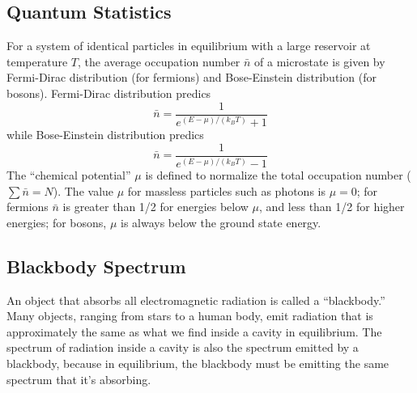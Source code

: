 \documentclass[../../../main.tex]{subfiles}
\begin{document}
\subsection{Quantum Statistics}
For a system of identical particles in equilibrium with a large reservoir at temperature $T$, the average occupation number $\bar{n}$ of a microstate is given by Fermi-Dirac distribution (for fermions) and Bose-Einstein distribution (for bosons). Fermi-Dirac distribution predics
\begin{equation*}
    \bar{n}=\frac{1}{e^{(E-\mu)/(k_BT)}+1}
\end{equation*}
while Bose-Einstein distribution predics
\begin{equation*}
    \bar{n}=\frac{1}{e^{(E-\mu)/(k_BT)}-1}
\end{equation*}
The “chemical potential” $\mu$ is defined to normalize the total occupation number ($\sum \bar{n} = N$). The value $\mu$ for massless particles such as photons is $\mu=0 $; for fermions $\bar{n}$ is greater than 1/2 for energies below $\mu$, and less than 1/2 for higher energies; for bosons, $\mu$ is always below the ground state energy.

\subsection{Blackbody Spectrum}
An object that absorbs all electromagnetic radiation is called a “blackbody.” Many objects, ranging from stars to a human body, emit radiation that is approximately the same as what we find inside a cavity in equilibrium. The spectrum of radiation inside a cavity is also the spectrum emitted by a blackbody, because in equilibrium, the blackbody must be emitting the same spectrum that it's absorbing. 
\end{document}
